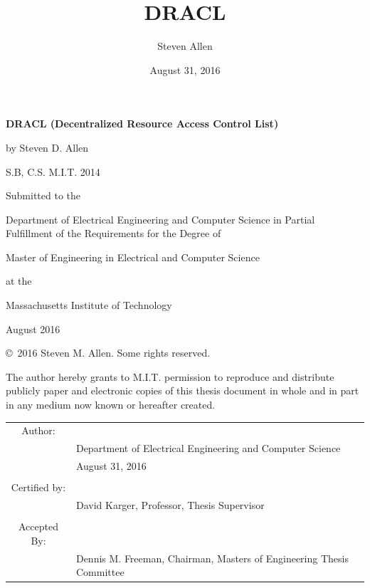 \documentclass[pdftex,12pt,a4papaer,twoside,notitlepage]{report}
\title{DRACL}
\author{Steven Allen}
\date{August 31, 2016}
\begin{document}

\begin{titlingpage}

  \begin{singlespacing}

    \setlength{\parskip}{1em}
    \begin{center}

      \textbf{DRACL (Decentralized Resource Access Control List)}

      by Steven D. Allen

      S.B, C.S. M.I.T. 2014

      \vspace{2em}

      Submitted to the

      Department of Electrical Engineering and Computer Science in
      Partial Fulfillment of the Requirements for the Degree of

      Master of Engineering in Electrical and Computer Science

      at the

      Massachusetts Institute of Technology

      August 2016

      \copyright~2016 Steven M. Allen. Some rights reserved.

      The author hereby grants to M.I.T. permission to reproduce and distribute
      publicly paper and electronic copies of this thesis document in whole and in
      part in any medium now known or hereafter created.

      \vspace{3em}
      \begin{tabular}{c l}
        Author: & \hrulefill \\
                & {\small Department of Electrical Engineering and Computer Science } \\
                & {\small August 31, 2016 } \\
        \\
        Certified by: & \hrulefill \\
                & {\small David Karger, Professor, Thesis Supervisor } \\
        \\
        Accepted By: & \hrulefill \\
                & {\small Dennis M. Freeman, Chairman, Masters of Engineering Thesis Committee } \\
      \end{tabular}
    \end{center}

  \end{singlespacing}

\end{titlingpage}
\end{document}
